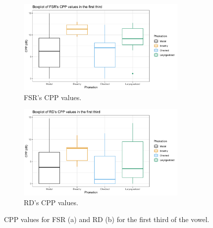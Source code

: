 \documentclass[12pt, letterpaper]{article}
\begin{document}
\begin{figure}[!ht]
	\centering
	\begin{subfigure}{.5\textwidth}
		\centering
		\includegraphics[width=0.9\textwidth]{../mean_FSR_cpp_First.png}
		\caption{FSR's CPP values.}
		\label{fig:FSRcppfirst} 
	\end{subfigure}%
	\begin{subfigure}{.5\textwidth}
		\centering
		\includegraphics[width=0.9\textwidth]{../mean_RD_cpp_First.png}
		\caption{RD's CPP values.}
		\label{fig:RDcppfirst} 
	\end{subfigure}
	\caption{CPP values for FSR (a) and RD (b) for the first third of the vowel. }
	\label{fig:cppfirst}
\end{figure}
\end{document}
